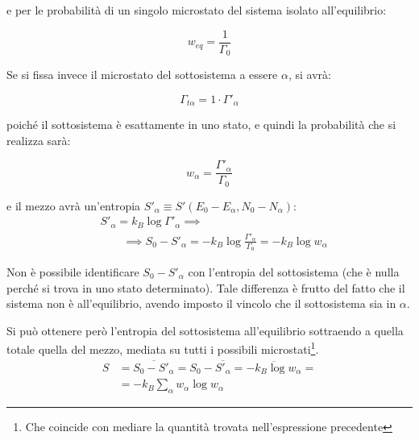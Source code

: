 \noindent e per le probabilità di un singolo microstato del sistema isolato all'equilibrio:

\begin{equation*}
w_{eq} = \frac{1}{\Gamma_0}
\end{equation*}

Se si fissa invece il microstato del sottosistema a essere $\alpha$, si avrà:

\begin{equation*}
\Gamma_{t\alpha} = 1 \cdot \Gamma'_\alpha
\end{equation*}

\noindent poiché il sottosistema è esattamente in uno stato, e quindi la probabilità che si realizza sarà:

\begin{equation*}
w_\alpha = \frac{\Gamma'_{\alpha}}{\Gamma_0}
\end{equation*}

\noindent e il mezzo avrà un'entropia $S'_\alpha \equiv S'(E_0 - E_\alpha, N_0 - N_\alpha)$\footnotemark:
\begin{align*}
&S'_\alpha = k_B \log \Gamma'_\alpha \implies \\
& \qquad \implies S_0 - S'_\alpha = - k_B \log \frac{\Gamma'_{\alpha}}{\Gamma_0} = - k_B \log w_\alpha
\end{align*}

Non è possibile identificare $S_0 - S'_\alpha$ con l'entropia del sottosistema (che è nulla perché si trova in uno stato determinato). Tale differenza è frutto del fatto che il sistema non è all'equilibrio, avendo imposto il vincolo che il sottosistema sia in $\alpha$.

Si può ottenere però l'entropia del sottosistema all'equilibrio sottraendo a quella totale quella del mezzo, mediata su tutti i possibili microstati\footnote{Che coincide con mediare la quantità trovata nell'espressione precedente}.
\begin{align*}
S &= \overline{S_0 - S'_\alpha} = S_0 - \overline{S'_\alpha} = \overline{- k_B \log w_\alpha} = \\
&= - k_B \sum_{\alpha} w_\alpha \log w_\alpha
\end{align*}

